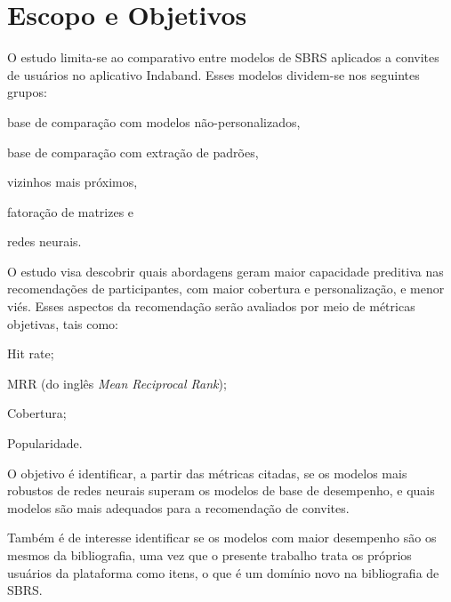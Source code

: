 \section{Escopo e Objetivos}

O estudo limita-se ao comparativo entre modelos de SBRS aplicados a convites de
usuários no aplicativo Indaband. Esses modelos dividem-se nos seguintes
grupos: 
\begin{inparaenum}[(1)]
  \item base de comparação com modelos não-personalizados,
  \item base de comparação com extração de padrões,
  \item vizinhos mais próximos,
  \item fatoração de matrizes e
  \item redes neurais.
\end{inparaenum}

O estudo visa descobrir quais abordagens geram maior capacidade preditiva nas
recomendações de participantes, com maior cobertura e personalização, e menor
viés. Esses aspectos da recomendação serão avaliados por meio de métricas
objetivas, tais como:
\begin{inparaenum}[(1)]
  \item Hit rate;
  \item MRR (do inglês \textit{Mean Reciprocal Rank});
  \item Cobertura;
  \item Popularidade.
\end{inparaenum}

O objetivo é identificar, a partir das métricas citadas, se os modelos mais
robustos de redes neurais superam os modelos de base de desempenho, e quais
modelos são mais adequados para a recomendação de convites.

Também é de interesse identificar se os modelos com maior desempenho são os
mesmos da bibliografia, uma vez que o presente trabalho trata os próprios
usuários da plataforma como itens, o que é um domínio novo na bibliografia de
SBRS.
